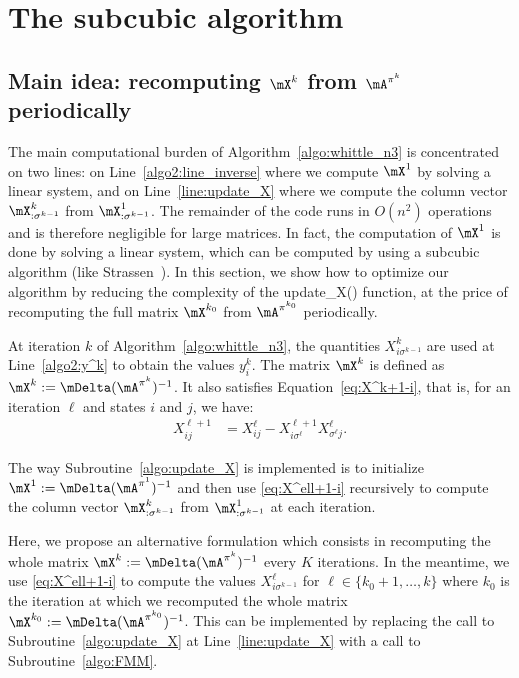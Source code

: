 \section{The subcubic algorithm}
\label{sec:subcubic algorithm}

\subsection{Main idea: recomputing \texorpdfstring{$\mX^{k}$ from $\mA^{\pi^k}$}{Xk from Apik} periodically}

The main computational burden of Algorithm~\ref{algo:whittle_n3} is concentrated on two lines: on Line~\ref{algo2:line_inverse} where we compute $\mX^1$ by solving a linear system, and on Line~\ref{line:update_X} where we compute the column vector $\mX^{k}_{:\sigma^{k-1}}$ from $\mX^1_{: \sigma^{k-1}}$. The remainder of the code runs in $O(n^2)$ operations and is therefore negligible for large matrices. In fact, the computation of $\mX^1$ is done by solving a linear system, which can be computed by using a subcubic algorithm (like Strassen~\cite{strassen1969gaussian}). In this section, we show how to optimize our algorithm by reducing the complexity of the update\_X() function, at the price of recomputing the full matrix $\mX^{k_0}$ from $\mA^{\pi^{k_0}}$ periodically.

At iteration $k$ of Algorithm~\ref{algo:whittle_n3}, the quantities $X^{k}_{i\sigma^{k-1}}$ are used at Line~\ref{algo2:y^k} to obtain the values $y^{k}_i$. The matrix $\mX^k$ is defined as $\mX^k:=\mDelta(\mA^{\pi^k})^{-1}$. It also satisfies Equation~\eqref{eq:X^k+1-i}, that is, for an iteration $\ell$ and states $i$ and $j$, we have: 
\begin{align}
    \label{eq:X^ell+1-i}
    X^{\ell+1}_{ij} &= X^{\ell}_{ij} - X^{\ell+1}_{i\sigma^\ell} X^{\ell}_{{\sigma^\ell} j}.
\end{align}

The way Subroutine~\ref{algo:update_X} is implemented is to initialize $\mX^1:=\mDelta(\mA^{\pi^1})^{-1}$ and then use \eqref{eq:X^ell+1-i} recursively to compute the column vector $\mX^{k}_{: \sigma^{k-1}}$ from $\mX^1_{: \sigma^{k-1}}$ at each iteration.

Here, we propose an alternative formulation which consists in recomputing the whole matrix $\mX^{k}:=\mDelta(\mA^{\pi^k})^{-1}$ every $K$ iterations. In the meantime, we use \eqref{eq:X^ell+1-i} to compute the values $X^{\ell}_{i\sigma^{k-1}}$ for ${\ell\in\{k_0+1,\dots, k\}}$ where $k_0$ is the iteration at which we recomputed the whole matrix ${\mX^{k_0}:=\mDelta(\mA^{\pi^{k_0}})^{-1}}$. This can be implemented by replacing the call to Subroutine~\ref{algo:update_X} at Line~\ref{line:update_X} with a call to Subroutine~\ref{algo:FMM}.

